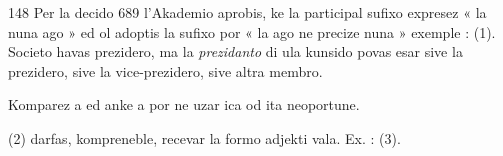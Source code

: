 \begin{VUpage}[152]{148}
Per la decido 689 l'Akademio aprobis, ke la participal\nl
sufixo  expresez « la nuna ago » ed ol adoptis la sufixo\nl
{} por « la ago ne precize nuna » exemple :  (1).\nl
Societo havas prezidero, ma la \textit{prezidanto} di ula kunsido\nl
povas esar sive la prezidero, sive la vice-prezidero, sive altra\nl
membro.

Komparez  a  ed anke a  por ne uzar ica od\nl
ita neoportune.

 (2) darfas, kompreneble, recevar la formo adjekti\cc
vala. Ex. : \nl
{}\nl
{} (3).
\end{VUpage}

